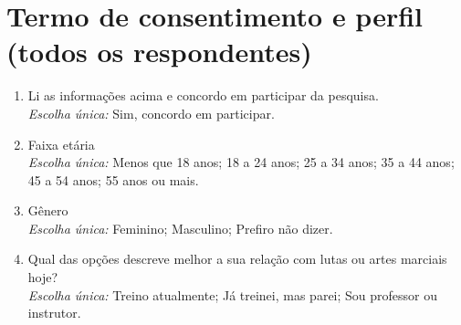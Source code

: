 \section*{Termo de consentimento e perfil (todos os respondentes)}
\begin{enumerate}[leftmargin=*, itemsep=1pt, parsep=0pt]
  \item Li as informações acima e concordo em participar da pesquisa.\\
        {\footnotesize\textit{Escolha única:} Sim, concordo em participar.}
  \item Faixa etária\\
        {\footnotesize\textit{Escolha única:} Menos que 18 anos; 18 a 24 anos; 25 a 34 anos; 35 a 44 anos; 45 a 54 anos; 55 anos ou mais.}
  \item Gênero\\
        {\footnotesize\textit{Escolha única:} Feminino; Masculino; Prefiro não dizer.}
  \item Qual das opções descreve melhor a sua relação com lutas ou artes marciais hoje?\\
        {\footnotesize\textit{Escolha única:} Treino atualmente; Já treinei, mas parei; Sou professor ou instrutor.}
\end{enumerate}

